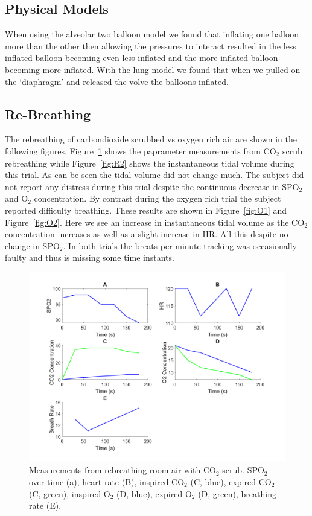 \documentclass[12pt]{article}
\newcommand{\coo}{CO$_2$}
\newcommand{\oo}{O$_2$}
\newcommand{\spo}{SPO$_2$}
\begin{document}
\subsection{Physical Models}
When using the alveolar two balloon model we found that inflating one balloon more than the other then allowing the pressures to interact resulted in the less inflated balloon becoming even less inflated and the more inflated balloon becoming more inflated. With the lung model we found that when we pulled on the `diaphragm' and released the volve the balloons inflated.


\subsection{Re-Breathing}

The rebreathing of carbondioxide scrubbed vs oxygen rich air are shown in the following figures. Figure~\ref{fig:R1} shows the paprameter measurements from \coo{} scrub rebreathing while Figure~\ref{fig:R2} shows the instantaneous tidal volume during this trial. As can be seen the tidal volume did not change much. The subject did not report any distress during this trial despite the continuous decrease in \spo{} and \oo{} concentration. By contrast during the oxygen rich trial the subject reported difficulty breathing. These results are shown in Figure~\ref{fig:O1} and Figure~\ref{fig:O2}. Here we see an increase in instantaneous tidal volume as the \coo{} concentration increases as well as a slight increase in HR. All this despite no change in \spo. In both trials the breats per minute tracking was occasionally faulty and thus is missing some time instants.

\begin{figure}[H]
	
	\centering
	\includegraphics[width = .8\textwidth]{Figures/room_1.png}
	\caption{Measurements from rebreathing room air with \coo{} scrub. \spo{} over time (a), heart rate (B), inspired \coo{} (C, blue), expired \coo{} (C, green), inspired \oo{} (D, blue), expired \oo{} (D, green), breathing rate (E). }
	\label{fig:R1}
\end{figure}
\end{document}
